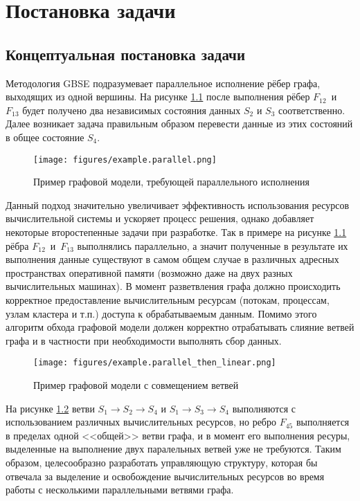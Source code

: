 \chapter{Постановка задачи}
\section{Концептуальная постановка задачи}\label{sec:concept}

Методология GBSE подразумевает параллельное исполнение рёбер графа, выходящих из одной вершины. На рисунке \ref{fig:parallelExample} после выполнения рёбер $F_{12}$~и~$F_{13}$ будет получено два независимых состояния данных $S_2$ и $S_3$ соответственно. Далее возникает задача правильным образом перевести данные из этих состояний в общее состояние $S_4$.
\begin{figure}[!ht]
    \centering
    \texttt{[image: figures/example.parallel.png]}
    \caption{Пример графовой модели, требующей параллельного исполнения}
    \label{fig:parallelExample}
\end{figure}

Данный подход значительно увеличивает эффективность использования ресурсов вычислительной системы и ускоряет процесс решения, однако добавляет некоторые второстепенные задачи при разработке. Так в примере на рисунке \ref{fig:parallelExample} рёбра $F_{12}$~и~$F_{13}$ выполнялись параллельно, а значит полученные в результате их выполнения данные существуют в самом общем случае в различных адресных пространствах оперативной памяти (возможно даже на двух разных вычислительных машинах). В момент разветвления графа должно происходить корректное предоставление вычислительным ресурсам (потокам, процессам, узлам кластера и т.п.) доступа к обрабатываемым данным. Помимо этого алгоритм обхода графовой модели должен корректно отрабатывать слияние ветвей графа и в частности при необходимости выполнять сбор данных.

\begin{figure}[!ht]
    \centering
    \texttt{[image: figures/example.parallel\_then\_linear.png]}
    \caption{Пример графовой модели с совмещением ветвей}
    \label{fig:parallelThenLinearExample}
\end{figure}

На рисунке \ref{fig:parallelThenLinearExample} ветви $S_1 \rightarrow S_2 \rightarrow S_4$ и $S_1 \rightarrow S_3 \rightarrow S_4$ выполняются с использованием различных вычислительных ресурсов, но ребро $F_{45}$ выполняется в пределах одной <<общей>> ветви графа, и в момент его выполнения ресуры, выделенные на выполнение двух паралельных ветвей уже не требуются. Таким образом, целесообразно разработать управляющую структуру, которая бы отвечала за выделение и освобождение вычислительных ресурсов во время работы с несколькими параллельными ветвями графа.

